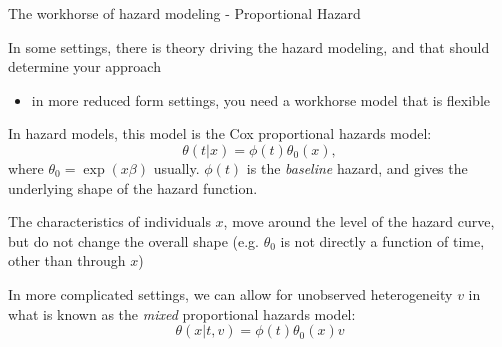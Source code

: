 \documentclass[notes,11pt, aspectratio=169]{beamer}
\newenvironment{wideitemize}{\itemize\addtolength{\itemsep}{10pt}}{\enditemize}
\begin{document}
  \begin{frame}{The workhorse of hazard modeling - Proportional Hazard}
    \begin{wideitemize}
    \item In some settings, there is theory driving the hazard
      modeling, and that should determine your approach
      \begin{itemize}
      \item in more reduced form settings, you need a workhorse model that
      is flexible
      \end{itemize}
    \item In hazard models, this model is the Cox proportional hazards model:
      \begin{equation}
        \theta(t | x) = \phi(t) \theta_{0}(x) , 
      \end{equation}
      where $\theta_{0} = \exp(x\beta)$ usually. $\phi(t)$ is the
      \emph{baseline} hazard, and gives the underlying shape of the
      hazard function.
    \item The characteristics of individuals $x$, move around the
      level of the hazard curve, but do not change the overall shape
      (e.g. $\theta_{0}$ is not directly a function of time, other
      than through $x$)
    \item In more complicated settings, we can allow for unobserved
      heterogeneity $v$ in what is known as the \emph{mixed} proportional
      hazards model:
      \begin{equation}
        \theta(x|t, v) = \phi(t) \theta_{0}(x) v
      \end{equation}
      
    \end{wideitemize}
  \end{frame}
  
\end{document}
